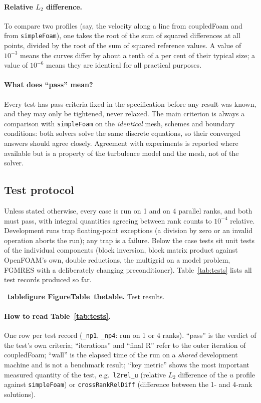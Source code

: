 \documentclass[11pt,a4paper]{article}
\makeatletter
\def\cf@figname{figure}
\newcommand{\cfpendingitem}[3]{%
  \par\smallskip\noindent\refstepcounter{#1}\label{#3}%
  \def\cf@kind{#1}%
  {\footnotesize\fbox{\scriptsize pending}~\textbf{\ifx\cf@kind\cf@figname
    Figure\else Table\fi~\csname the#1\endcsname.} #2\par}\smallskip}
\newcommand{\cftable}[3]{%
  \IfFileExists{tables/#1.tex}%
    {}%
    {\cfpendingitem{table}{#2}{#3}}}
\newcommand{\code}[1]{\texttt{#1}}
\makeatother
\begin{document}
\paragraph{Relative $L_2$ difference.} To compare two profiles (say, the
velocity along a line from coupledFoam and from \code{simpleFoam}), one
takes the root of the sum of squared differences at all points, divided by
the root of the sum of squared reference values. A value of $10^{-3}$ means
the curves differ by about a tenth of a per cent of their typical size; a
value of $10^{-6}$ means they are identical for all practical purposes.

\paragraph{What does ``pass'' mean?} Every test has pass criteria fixed
in the specification before any result was known, and they may only be
tightened, never relaxed. The main criterion is always a comparison with
\code{simpleFoam} on the \emph{identical} mesh, schemes and boundary
conditions: both solvers solve the same discrete equations, so their
converged answers should agree closely. Agreement with experiments is
reported where available but is a property of the turbulence model and the
mesh, not of the solver.

\subsection{Test protocol}\label{sec:testprotocol}

Unless stated otherwise, every case is run on 1 and on 4 parallel ranks, and
both must pass, with integral quantities agreeing between rank counts to
$10^{-4}$ relative. Development runs trap floating-point exceptions (a
division by zero or an invalid operation aborts the run); any trap is a
failure. Below the case tests sit unit tests of the individual components
(block inversion, block matrix product against OpenFOAM's own, double
reductions, the multigrid on a model problem, FGMRES with a deliberately
changing preconditioner). Table~\ref{tab:tests} lists all test records
produced so far.

\cftable{tests}{Test results.}{tab:tests}

\paragraph{How to read Table~\ref{tab:tests}.} One row per test record
(\code{\_np1}, \code{\_np4}: run on 1 or 4 ranks). ``pass'' is the verdict
of the test's own criteria; ``iterations'' and ``final R'' refer to the
outer iteration of coupledFoam; ``wall'' is the elapsed time of the run on
a \emph{shared} development machine and is not a benchmark result;
``key metric'' shows the most important measured quantity of the test,
e.g.\ \code{l2rel\_u} (relative $L_2$ difference of the $u$ profile against
\code{simpleFoam}) or \code{crossRankRelDiff} (difference between the 1- and
4-rank solutions).
\end{document}

